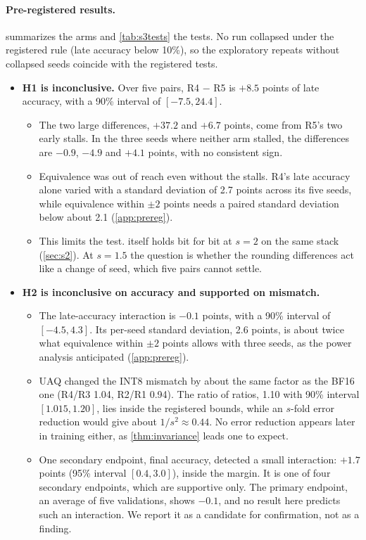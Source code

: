 \paragraph{Pre-registered results.}  summarizes the arms and \cref{tab:s3tests} the tests. No run collapsed under the registered rule (late accuracy below 10\%), so the exploratory repeats without collapsed seeds coincide with the registered tests.
\begin{itemize}[leftmargin=*,itemsep=2pt]
\item \textbf{H1 is inconclusive.} Over five pairs, R4 $-$ R5 is $+8.5$ points of late accuracy, with a 90\% interval of $[-7.5, 24.4]$.
  \begin{itemize}[leftmargin=*,itemsep=1pt]
  \item The two large differences, $+37.2$ and $+6.7$ points, come from R5's two early stalls. In the three seeds where neither arm stalled, the differences are $-0.9$, $-4.9$ and $+4.1$ points, with no consistent sign.
  \item Equivalence was out of reach even without the stalls. R4's late accuracy alone varied with a standard deviation of 2.7 points across its five seeds, while equivalence within $\pm2$ points needs a paired standard deviation below about 2.1 (\cref{app:prereg}).
  \item This limits the test.  itself holds bit for bit at $s=2$ on the same stack (\cref{sec:s2}). At $s=1.5$ the question is whether the rounding differences act like a change of seed, which five pairs cannot settle.
  \end{itemize}
\item \textbf{H2 is inconclusive on accuracy and supported on mismatch.}
  \begin{itemize}[leftmargin=*,itemsep=1pt]
  \item The late-accuracy interaction is $-0.1$ points, with a 90\% interval of $[-4.5, 4.3]$. Its per-seed standard deviation, 2.6 points, is about twice what equivalence within $\pm2$ points allows with three seeds, as the power analysis anticipated (\cref{app:prereg}).
  \item UAQ changed the INT8 mismatch by about the same factor as the BF16 one (R4/R3 1.04, R2/R1 0.94). The ratio of ratios, 1.10 with 90\% interval $[1.015, 1.20]$, lies inside the registered bounds, while an $s$-fold error reduction would give about $1/s^2\approx0.44$. No error reduction appears later in training either, as \cref{thm:invariance} leads one to expect.
  \item One secondary endpoint, final accuracy, detected a small interaction: $+1.7$ points (95\% interval $[0.4, 3.0]$), inside the margin. It is one of four secondary endpoints, which are supportive only. The primary endpoint, an average of five validations, shows $-0.1$, and no result here predicts such an interaction. We report it as a candidate for confirmation, not as a finding.

\end{itemize}
\end{itemize}
